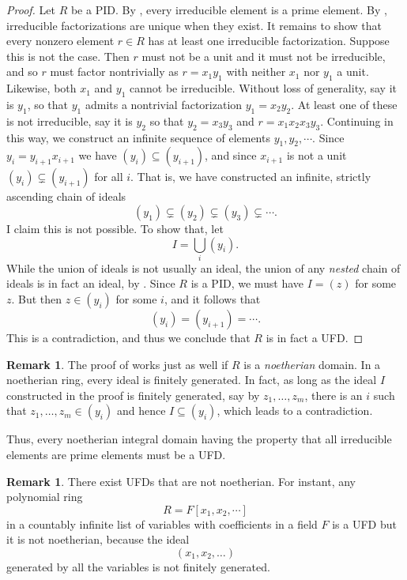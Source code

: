 \documentclass[12pt]{report}
\numberwithin{equation}{section}
\numberwithin{theorem}{chapter}
\theoremstyle{definition}
\newtheorem*{basic properties}{Basic Properties}
\newtheorem*{Important Remark}{Important Remark}
\newtheorem{remark}[theorem]{Remark}
\begin{document}
\begin{proof} 
Let $R$ be a PID.
By , every irreducible element is a prime element.
By , irreducible factorizations are unique when they exist. 
It remains to show that every nonzero element $r \in R$ has at least one irreducible factorization. Suppose this is not the case. Then $r$ must not be a unit and it must not be irreducible, and so $r$ must factor nontrivially as $r =x_1 y_1$ with neither $x_1$ nor $y_1$ a unit. Likewise, both $x_1$ and $y_1$ cannot be irreducible. Without loss of generality, say it is $y_1$, so that $y_1$ admits a nontrivial factorization $y_1 = x_2 y_2$. At least one of these is not irreducible, say it is $y_2$ so that $y_2 = x_3 y_3$ and $r = x_1x_2x_3y_3$. 
Continuing in this way, we construct an infinite sequence of elements $y_1, y_2, \cdots$.
Since $y_i = y_{i+1}x_{i+1}$ we have $(y_i) \subseteq (y_{i+1})$, and since $x_{i+1}$ is not a unit $(y_i) \subsetneq (y_{i+1})$ for all $i$.
That is, we have constructed an infinite, strictly ascending chain of ideals
$$(y_1) \subsetneq (y_2) \subsetneq (y_3) \subsetneq \cdots.$$
I claim this is not possible. To show that, let 
$$I = \bigcup_i (y_i).$$ 
While the union of ideals is not usually an ideal, the union of any {\em nested} chain of ideals is in fact an ideal, by . Since $R$ is a PID, we must have $I = (z)$ for some $z$. But then $z \in (y_i)$ for
some $i$, and it follows that 
$$(y_i) = (y_{i+1}) = \cdots.$$
This is a contradiction, and thus we conclude that $R$ is in fact a UFD.
\end{proof}


\begin{remark} 
The proof of  works just as well if $R$ is a {\em noetherian} domain. In a noetherian ring, every ideal is finitely generated. In fact, as long as the ideal $I$ constructed in the proof is finitely generated, say by $z_1, \dots, z_m$, there is an $i$ such that $z_1, \dots, z_m \in (y_i)$ and hence $I \subseteq (y_i)$, which leads to a contradiction.

Thus,  every noetherian integral domain having the property that all  irreducible elements are prime elements must be a UFD.
\end{remark}


\begin{remark}
There exist UFDs that are not noetherian. For instant, any polynomial ring 
$$R = F[x_1, x_2, \cdots]$$ 
in a countably infinite list of variables with coefficients in a field $F$ is a UFD but it is not noetherian, because the ideal
$$(x_1, x_2, \ldots)$$	
generated by all the variables is not finitely generated.
\end{remark}
\end{document}
